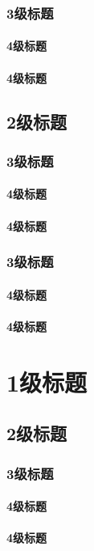 \subsection{3级标题}
\subsubsection{4级标题}
\subsubsection{4级标题}
\section{2级标题}
\subsection{3级标题}
\subsubsection{4级标题}
\subsubsection{4级标题}
\subsection{3级标题}
\subsubsection{4级标题}
\subsubsection{4级标题}

\chapter{1级标题}
\section{2级标题}
\subsection{3级标题}
\subsubsection{4级标题}
\subsubsection{4级标题}
